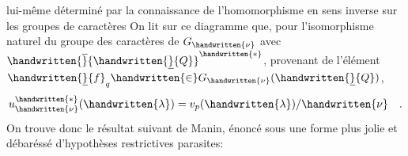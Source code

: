 lui-même déterminé par la connaissance de l'homomorphisme en sens inverse sur les groupes de caractères
On lit sur ce diagramme que, pour l'isomorphisme naturel du groupe des caractères de $G_{\handwritten{\nu}}$ avec $\handwritten{\overline}{\handwritten{\underline}{Q}}^{\handwritten{*}}$, provenant de l'élément $\handwritten{\underline}{f}_q\handwritten{\in}G_{\handwritten{\nu}}(\handwritten{\underline}{Q})$,  
\[
u_{\handwritten{\nu}}^{\handwritten{*}}(\handwritten{\lambda})=v_p(\handwritten{\lambda})/\handwritten{\nu}\quad .
\]
On trouve donc le résultat suivant de Manin, énoncé sous une forme plus jolie et débaréssé d'hypothèses restrictives parasites:

